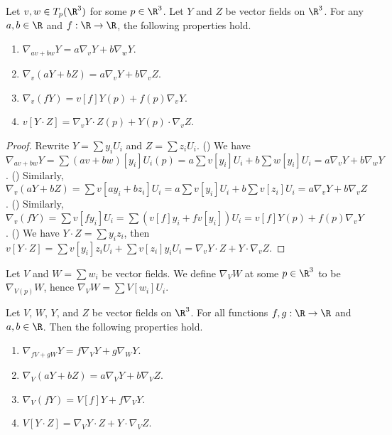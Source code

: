 \documentclass[10pt]{article}
\begin{document}
\begin{proposition}
    Let $v,w\in{T}_{p}({\R}^{3})$ for some $p\in{\R}^{3}$. Let $Y$ and $Z$ be vector fields on ${\R}^{3}$. For any $a,b\in\R$ and $f:\R\to\R$, the following properties hold.
    \begin{enumerate}
        \item ${\nabla}_{av+bw}Y=a{\nabla}_{v}Y+b{\nabla}_{w}Y$.
        \item ${\nabla}_{v}(aY+bZ)=a{\nabla}_{v}Y+b{\nabla}_{v}Z$.
        \item ${\nabla}_{v}(fY)=v[f]Y(p)+f(p){\nabla}_{v}Y$.
        \item $v[Y\cdot Z]={\nabla}_{v}Y\cdot Z(p)+Y(p)\cdot{\nabla}_{v}Z$.
    \end{enumerate}
\end{proposition}
\begin{proof}
    Rewrite $Y=\sum{y}_{i}{U}_{i}$ and $Z=\sum{z}_{i}{U}_{i}$. () We have ${\nabla}_{av+bw}Y=\sum(av+bw)[{y}_{i}]{U}_{i}(p)=a\sum v[{y}_{i}]{U}_{i}+b\sum w[{y}_{i}]{U}_{i}=a{\nabla}_{v}Y+b{\nabla}_{w}Y$. () Similarly, ${\nabla}_{v}(aY+bZ)=\sum v[a{y}_{i}+b{z}_{i}]{U}_{i}=a\sum v[{y}_{i}]{U}_{i}+b\sum v[{z}_{i}]{U}_{i}=a{\nabla}_{v}Y+b{\nabla}_{v}Z$. () Similarly, ${\nabla}_{v}(fY)=\sum v[f{y}_{i}]{U}_{i}=\sum(v[f]{y}_{i}+fv[{y}_{i}]){U}_{i}=v[f]Y(p)+f(p){\nabla}_{v}Y$. () We have $Y\cdot Z=\sum{y}_{i}{z}_{i}$, then $v[Y\cdot Z]=\sum v[{y}_{i}]{z}_{i}{U}_{i}+\sum v[{z}_{i}]{y}_{i}{U}_{i}={\nabla}_{v}Y\cdot Z+Y\cdot{\nabla}_{v}Z$.
\end{proof}
\par
Let $V$ and $W=\sum{w}_{i}$ be vector fields. We define ${\nabla}_{V}W$ at some $p\in{\R}^{3}$ to be ${\nabla}_{V(p)}W$, hence ${\nabla}_{V}W=\sum V[{w}_{i}]{U}_{i}$.
\begin{proposition}
    Let $V$, $W$, $Y$, and $Z$ be vector fields on ${\R}^{3}$. For all functions $f,g:\R\to\R$ and $a,b\in\R$. Then the following properties hold.
    \begin{enumerate}
        \item ${\nabla}_{fV+gW}Y=f{\nabla}_{V}Y+g{\nabla}_{W}Y$.
        \item ${\nabla}_{V}(aY+bZ)=a{\nabla}_{V}Y+b{\nabla}_{V}Z$.
        \item ${\nabla}_{V}(fY)=V[f]Y+f{\nabla}_{V}Y$.
        \item $V[Y\cdot Z]={\nabla}_{V}Y\cdot Z+Y\cdot{\nabla}_{V}Z$.
    \end{enumerate}
\end{proposition}
\end{document}
